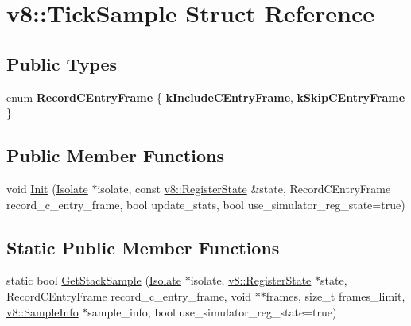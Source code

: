 \hypertarget{structv8_1_1TickSample}{}\section{v8\+:\+:Tick\+Sample Struct Reference}
\label{structv8_1_1TickSample}
\subsection*{Public Types}
\begin{DoxyCompactItemize}
\item 
\mbox{\label{structv8_1_1TickSample_ae3223c2114f7140f8af1793802b94d42}} 
enum {\bfseries Record\+C\+Entry\+Frame} \{ {\bfseries k\+Include\+C\+Entry\+Frame}, 
{\bfseries k\+Skip\+C\+Entry\+Frame}
 \}
\end{DoxyCompactItemize}
\subsection*{Public Member Functions}
\begin{DoxyCompactItemize}
\item 
void \mbox{\hyperlink{structv8_1_1TickSample_a5e763b4b249b3fba53241b82d4ef6eeb}{Init}} (\mbox{\hyperlink{classv8_1_1Isolate}{Isolate}} $\ast$isolate, const \mbox{\hyperlink{structv8_1_1RegisterState}{v8\+::\+Register\+State}} \&state, Record\+C\+Entry\+Frame record\+\_\+c\+\_\+entry\+\_\+frame, bool update\+\_\+stats, bool use\+\_\+simulator\+\_\+reg\+\_\+state=true)
\end{DoxyCompactItemize}
\subsection*{Static Public Member Functions}
\begin{DoxyCompactItemize}
\item 
static bool \mbox{\hyperlink{structv8_1_1TickSample_a297e05d112f3c749bfead215393646c1}{Get\+Stack\+Sample}} (\mbox{\hyperlink{classv8_1_1Isolate}{Isolate}} $\ast$isolate, \mbox{\hyperlink{structv8_1_1RegisterState}{v8\+::\+Register\+State}} $\ast$state, Record\+C\+Entry\+Frame record\+\_\+c\+\_\+entry\+\_\+frame, void $\ast$$\ast$frames, size\+\_\+t frames\+\_\+limit, \mbox{\hyperlink{structv8_1_1SampleInfo}{v8\+::\+Sample\+Info}} $\ast$sample\+\_\+info, bool use\+\_\+simulator\+\_\+reg\+\_\+state=true)
\end{DoxyCompactItemize}
